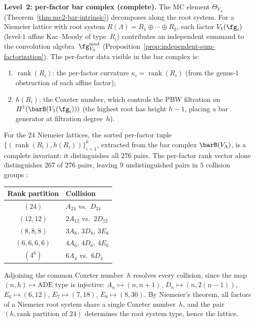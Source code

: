 \medskip
\noindent\textbf{Level~2: per-factor bar complex
(complete).}\;
The MC element $\Theta_{V_\Lambda}$
(Theorem~\ref{thm:mc2-bar-intrinsic})
decomposes along the root system.
For a Niemeier lattice with root system
$R(\Lambda) = R_1 \oplus \cdots \oplus R_k$,
each factor $V_1(\fg_i)$ (level-$1$ affine Kac--Moody of
type~$R_i$) contributes an independent summand to the
convolution algebra~$\fg^{\mathrm{mod}}_{V_\Lambda}$
(Proposition~\ref{prop:independent-sum-factorization}).
The per-factor data visible in the bar complex is:
\begin{enumerate}[label=\textup{(\alph*)}]
\item $\operatorname{rank}(R_i)$: the per-factor curvature
 $\kappa_i = \operatorname{rank}(R_i)$ (from the genus-$1$
 obstruction of each affine factor);
\item $h(R_i)$: the Coxeter number, which controls the
 PBW filtration on $H^1(\barB(V_1(\fg_i)))$ (the
 highest root has height $h - 1$, placing a bar generator
 at filtration degree~$h$).
\end{enumerate}

\begin{proposition}
\label{prop:niemeier-multichannel}
\ClaimStatusProvedHere
{}
For the $24$ Niemeier lattices, the sorted per-factor
tuple $\{(\operatorname{rank}(R_i), h(R_i))\}_{i=1}^{k}$,
extracted from the bar complex $\barB(V_\Lambda)$,
is a complete invariant: it distinguishes all
$276$ pairs.
The per-factor rank vector alone distinguishes $267$
of $276$ pairs, leaving $9$ undistinguished pairs
in $5$ collision groups%
\textup{:}
\begin{center}
\small
\renewcommand{\arraystretch}{1.2}
\begin{tabular}{cl}
\toprule
\textbf{Rank partition} & \textbf{Collision}\\
\midrule
$(24)$ & $A_{24}$ vs.\ $D_{24}$\\
$(12,12)$ & $2A_{12}$ vs.\ $2D_{12}$\\
$(8,8,8)$ & $3A_8$,\; $3D_8$,\; $3E_8$\\
$(6,6,6,6)$ & $4A_6$,\; $4D_6$,\; $4E_6$\\
$(4^6)$ & $6A_4$ vs.\ $6D_4$\\
\bottomrule
\end{tabular}
\end{center}
Adjoining the common Coxeter number~$h$ resolves
every collision, since the map
$(n, h) \mapsto \text{ADE type}$ is injective\textup{:}
$A_n \mapsto (n, n{+}1)$, $D_n \mapsto (n, 2(n{-}1))$,
$E_6 \mapsto (6, 12)$, $E_7 \mapsto (7, 18)$,
$E_8 \mapsto (8, 30)$.
By Niemeier's theorem, all factors of a Niemeier root system
share a single Coxeter number~$h$, and the pair
$(h, \text{rank partition of } 24)$ determines the root system
type, hence the lattice.
\end{proposition}

